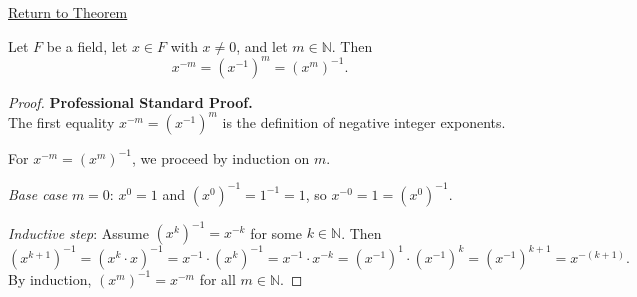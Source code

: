 \newpage
{}
\label{prf:negative-exponents-agree-with-inverse-power}

\begin{remark*}[Return]
\hyperref[thm:negative-exponents-agree-with-inverse-power]{Return to Theorem}
\end{remark*}

\begin{theorem*}
Let $F$ be a field, let $x\in F$ with $x\neq 0$, and let $m\in\mathbb{N}$.
Then
\[
x^{-m} = (x^{-1})^m = (x^m)^{-1}.
\]
\end{theorem*}

\begin{proof}
\textbf{Professional Standard Proof.}~\\
The first equality $x^{-m} = (x^{-1})^m$ is the definition of negative
integer exponents.

For $x^{-m} = (x^m)^{-1}$, we proceed by induction on $m$.

\emph{Base case} $m=0$: $x^0 = 1$ and $(x^0)^{-1} = 1^{-1} = 1$, so
$x^{-0} = 1 = (x^0)^{-1}$.

\emph{Inductive step}: Assume $(x^k)^{-1} = x^{-k}$ for some $k\in\mathbb{N}$.
Then
\[
(x^{k+1})^{-1}
= (x^k\cdot x)^{-1}
= x^{-1}\cdot (x^k)^{-1}
= x^{-1}\cdot x^{-k}
= (x^{-1})^1\cdot(x^{-1})^k
= (x^{-1})^{k+1}
= x^{-(k+1)}.
\]
By induction, $(x^m)^{-1} = x^{-m}$ for all $m\in\mathbb{N}$.
\end{proof}

